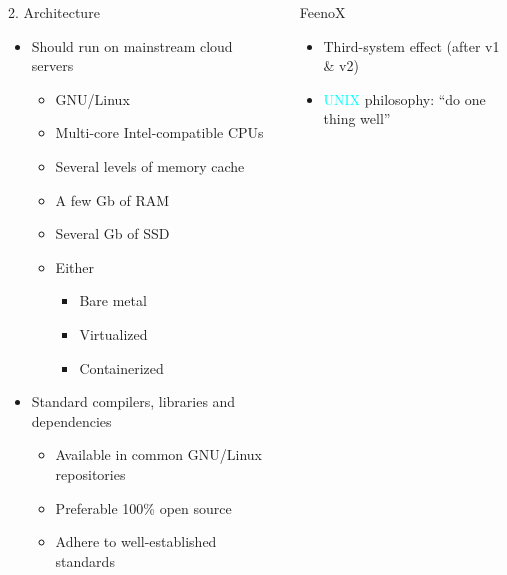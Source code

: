 \documentclass[
  ignorenonframetext,
  aspectratio=169,
]{beamer}
\providecommand{\tightlist}{%
  \setlength{\itemsep}{0pt}\setlength{\parskip}{0pt}}
\begin{document}
\begin{frame}[fragile]{}
\protect\hypertarget{section-3}{}
\begin{columns}[T]
\begin{column}{0.5\textwidth}
\begin{block}{2. Architecture}
\protect\hypertarget{architecture}{}
\newcommand{\unix}{{\textcolor{cyan}{UNIX}}}
\newcommand{\ruleof}[1]{{\textcolor{cyan}{Rule of {#1}}}}
\newcommand{\ruleofpar}[1]{\vspace{-0.25cm}\hfill{\footnotesize\textcolor{cyan}{(Rule of {#1})}}}

\begin{itemize}
\tightlist
\item
  Should run on mainstream cloud servers

  \begin{itemize}
  \tightlist
  \item
    GNU/Linux
  \item
    Multi-core Intel-compatible CPUs
  \item
    Several levels of memory cache
  \item
    A few Gb of RAM
  \item
    Several Gb of SSD
  \item
    Either

    \begin{itemize}
    \tightlist
    \item
      Bare metal
    \item
      Virtualized
    \item
      Containerized
    \end{itemize}
  \end{itemize}
\item
  Standard compilers, libraries and dependencies

  \begin{itemize}
  \tightlist
  \item
    Available in common GNU/Linux repositories
  \item
    Preferable 100\% open source
  \item
    Adhere to well-established standards
  \end{itemize}
\end{itemize}
\end{block}
\end{column}

\pause

\begin{column}{0.5\textwidth}
\begin{exampleblock}{FeenoX}
\protect\hypertarget{feenox-2}{}
\begin{itemize}
\item
  Third-system effect (after v1 \& v2)
\item
  {\textcolor{cyan}{UNIX}} philosophy: ``do one thing well''


\end{itemize}
\end{exampleblock}
\end{column}
\end{columns}
\end{frame}
\end{document}

